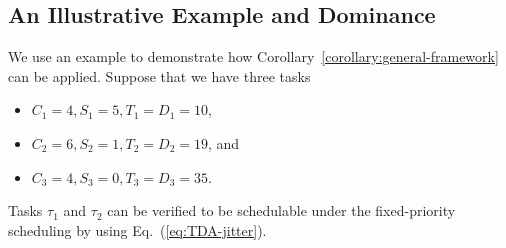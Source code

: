 \documentclass[10pt,conference]{IEEEtran}
\begin{document}
\subsection{An Illustrative Example and Dominance}

We use an example to demonstrate how
Corollary~\ref{corollary:general-framework} can be applied. Suppose
that we have three tasks
\begin{itemize}
\item $C_1 = 4, S_1 = 5, T_1=D_1=10$, 
\item $C_2 = 6, S_2 = 1, T_2=D_2=19$,  and
\item $C_3 = 4, S_3 = 0, T_3=D_3=35$.
\end{itemize}
Tasks $\tau_1$ and $\tau_2$ can be verified to be schedulable under
the fixed-priority scheduling by using Eq.~(\ref{eq:TDA-jitter}). 
\end{document}
